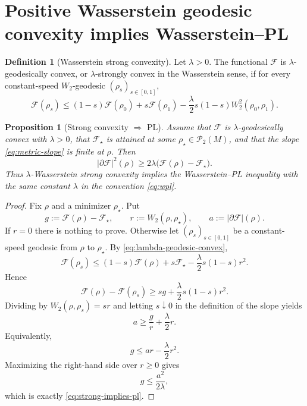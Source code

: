\documentclass[11pt]{article}
\newtheorem{proposition}[theorem]{Proposition}
\theoremstyle{definition}
\newtheorem{definition}[theorem]{Definition}
\newcommand{\Ptwo}{\mathcal P_2}
\newcommand{\F}{\mathcal F}
\newcommand{\W}{W_2}
\newcommand{\rhostar}{\rho_\star}
\begin{document}
\section{Positive Wasserstein geodesic convexity implies Wasserstein--PL}

\begin{definition}[Wasserstein strong convexity]
Let $\lambda>0$. The functional $\F$ is $\lambda$-geodesically convex, or $\lambda$-strongly convex in the Wasserstein sense, if for every constant-speed $\W$-geodesic $(\rho_s)_{s\in[0,1]}$,
\begin{equation}
        \F(\rho_s)
        \le (1-s)\F(\rho_0)+s\F(\rho_1)
        -\frac{\lambda}{2}s(1-s)\W^2(\rho_0,\rho_1).
        \label{eq:lambda-geodesic-convex}
\end{equation}
\end{definition}

\begin{proposition}[Strong convexity $\Rightarrow$ PL]\label{prop:strong-implies-pl}
Assume that $\F$ is $\lambda$-geodesically convex with $\lambda>0$, that $\F_\star$ is attained at some $\rhostar\in\Ptwo(M)$, and that the slope \eqref{eq:metric-slope} is finite at $\rho$. Then
\begin{equation}
        |\partial \F|^2(\rho)
        \ge 2\lambda\bigl(\F(\rho)-\F_\star\bigr).
        \label{eq:strong-implies-pl}
\end{equation}
Thus $\lambda$-Wasserstein strong convexity implies the Wasserstein--PL inequality with the same constant $\lambda$ in the convention \eqref{eq:wpl}.
\end{proposition}

\begin{proof}
Fix $\rho$ and a minimizer $\rhostar$. Put
\[
        g:=\F(\rho)-\F_\star,
        \qquad
        r:=\W(\rho,\rhostar),
        \qquad
        a:=|\partial\F|(\rho).
\]
If $r=0$ there is nothing to prove. Otherwise let $(\rho_s)_{s\in[0,1]}$ be a constant-speed geodesic from $\rho$ to $\rhostar$. By \eqref{eq:lambda-geodesic-convex},
\[
        \F(\rho_s)
        \le (1-s)\F(\rho)+s\F_\star
        -\frac{\lambda}{2}s(1-s)r^2.
\]
Hence
\[
        \F(\rho)-\F(\rho_s)
        \ge s g + \frac{\lambda}{2}s(1-s)r^2.
\]
Dividing by $\W(\rho,\rho_s)=sr$ and letting $s\downarrow0$ in the definition of the slope yields
\begin{equation}
        a\ge \frac{g}{r}+\frac{\lambda}{2}r.
        \label{eq:slope-geodesic-convex-bound}
\end{equation}
Equivalently,
\[
        g\le ar-\frac{\lambda}{2}r^2.
\]
Maximizing the right-hand side over $r\ge0$ gives
\[
        g\le \frac{a^2}{2\lambda},
\]
which is exactly \eqref{eq:strong-implies-pl}.
\end{proof}
\end{document}
